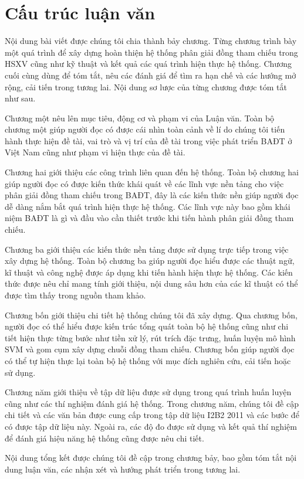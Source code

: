 \section{Cấu trúc luận văn}
Nội dung bài viết được chúng tôi chia thành bảy chương. Từng chương trình bày một quá trình để xây dựng hoàn thiện hệ thống phân giải đồng tham chiếu trong HSXV cũng như kỹ thuật và kết quả các quá trình hiện thực hệ thống. Chương cuối cùng dùng để tóm tắt, nêu các đánh giá để tìm ra hạn chế và các hướng mở rộng, cải tiến trong tương lai. Nội dung sơ lược của từng chương được tóm tắt như sau.

Chương một nêu lên mục tiêu, động cơ và phạm vi của Luận văn. Toàn bộ chương một giúp người đọc có được cái nhìn toàn cảnh về lí do chúng tôi tiến hành thực hiện đề tài, vai trò và vị trí của đề tài trong việc phát triển BAĐT ở Việt Nam cũng như phạm vi hiện thực của đề tài.

Chương hai giới thiệu các công trình liên quan đến hệ thống. Toàn bộ chương hai giúp người đọc có được kiến thức khái quát về các lĩnh vực nền tảng cho việc phân giải đồng tham chiếu trong BAĐT, đây là các kiến thức nền giúp người đọc dễ dàng nắm bắt quá trình hiện thực hệ thống. Các lĩnh vực này bao gồm khái niệm BAĐT là gì và đầu vào cần thiết trước khi tiến hành phân giải đồng tham chiếu.

Chương ba giới thiệu các kiến thức nền tảng được sử dụng trực tiếp trong việc xây dựng hệ thống. Toàn bộ chương ba giúp người đọc hiểu được các thuật ngữ, kĩ thuật và công nghệ được áp dụng khi tiến hành hiện thực hệ thống. Các kiến thức được nêu chỉ mang tính giới thiệu, nội dung sâu hơn của các kĩ thuật có thể được tìm thấy trong nguồn tham khảo.

Chương bốn giới thiệu chi tiết hệ thống chúng tôi đã xây dựng. Qua chương bốn, người đọc có thể hiểu được kiến trúc tổng quát toàn bộ hệ thống cũng như chi tiết hiện thực từng bước như tiền xử lý, rút trích đặc trưng, huấn luyện mô hình SVM và gom cụm xây dựng chuỗi đồng tham chiếu. Chương bốn giúp người đọc có thể tự hiện thực lại toàn bộ hệ thống với mục đích nghiên cứu, cải tiến hoặc sử dụng.

Chương năm giới thiệu về tập dữ liệu được sử dụng trong quá trình huấn luyện cũng như các thí nghiệm đánh giá hệ thống. Trong chương năm, chúng tôi đề cập chi tiết và các văn bản được cung cấp trong tập dữ liệu I2B2 2011 và các bước để có được tập dữ liệu này. Ngoài ra, các độ đo được sử dụng và kết quả thí nghiệm để đánh giá hiệu năng hệ thống cũng được nêu chi tiết.

Nội dung tổng kết được chúng tôi đề cập trong chương bảy, bao gồm tóm tắt nội dung luận văn, các nhận xét và hướng phát triển trong tương lai.